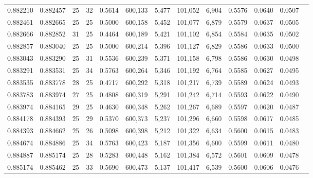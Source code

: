 \begin{tabular}{rrrrrrrrrrrrr}
0.882210 & 0.882457 &    25 &  32 &                                     0.5614 & 600,133 &   5,477 & 101,052 &   6,904 & 0.5576 & 0.0640 & 0.0507 \\
0.882461 & 0.882665 &    25 &  25 &                                     0.5000 & 600,158 &   5,452 & 101,077 &   6,879 & 0.5579 & 0.0637 & 0.0505 \\
0.882666 & 0.882852 &    31 &  25 &                                     0.4464 & 600,189 &   5,421 & 101,102 &   6,854 & 0.5584 & 0.0635 & 0.0502 \\
0.882857 & 0.883040 &    25 &  25 &                                     0.5000 & 600,214 &   5,396 & 101,127 &   6,829 & 0.5586 & 0.0633 & 0.0500 \\
0.883043 & 0.883290 &    25 &  31 &                                     0.5536 & 600,239 &   5,371 & 101,158 &   6,798 & 0.5586 & 0.0630 & 0.0498 \\
0.883291 & 0.883531 &    25 &  34 &                                     0.5763 & 600,264 &   5,346 & 101,192 &   6,764 & 0.5585 & 0.0627 & 0.0495 \\
0.883535 & 0.883778 &    28 &  25 &                                     0.4717 & 600,292 &   5,318 & 101,217 &   6,739 & 0.5589 & 0.0624 & 0.0493 \\
0.883783 & 0.883974 &    27 &  25 &                                     0.4808 & 600,319 &   5,291 & 101,242 &   6,714 & 0.5593 & 0.0622 & 0.0490 \\
0.883974 & 0.884165 &    29 &  25 &                                     0.4630 & 600,348 &   5,262 & 101,267 &   6,689 & 0.5597 & 0.0620 & 0.0487 \\
0.884178 & 0.884393 &    25 &  29 &                                     0.5370 & 600,373 &   5,237 & 101,296 &   6,660 & 0.5598 & 0.0617 & 0.0485 \\
0.884393 & 0.884662 &    25 &  26 &                                     0.5098 & 600,398 &   5,212 & 101,322 &   6,634 & 0.5600 & 0.0615 & 0.0483 \\
0.884674 & 0.884886 &    25 &  34 &                                     0.5763 & 600,423 &   5,187 & 101,356 &   6,600 & 0.5599 & 0.0611 & 0.0480 \\
0.884887 & 0.885174 &    25 &  28 &                                     0.5283 & 600,448 &   5,162 & 101,384 &   6,572 & 0.5601 & 0.0609 & 0.0478 \\
0.885174 & 0.885462 &    25 &  33 &                                     0.5690 & 600,473 &   5,137 & 101,417 &   6,539 & 0.5600 & 0.0606 & 0.0476 \\

\end{tabular}
